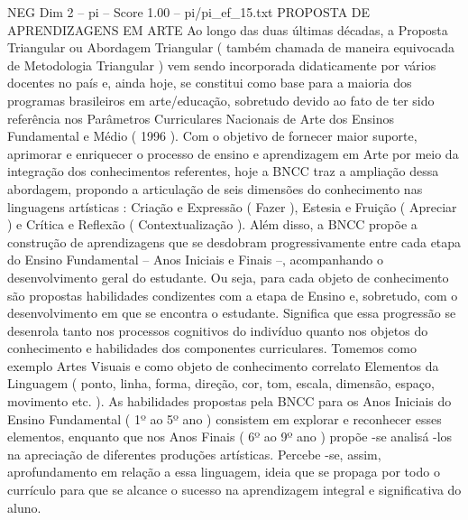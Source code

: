 \begin{textsample}{NEG Dim 2 – pi – Score 1.00 – pi/pi\_ef\_15.txt}  \label{ex:f2_neg_196}
PROPOSTA DE APRENDIZAGENS EM ARTE Ao longo das duas últimas décadas, a Proposta Triangular ou Abordagem Triangular ( também chamada de maneira equivocada de Metodologia Triangular ) vem sendo incorporada didaticamente por vários docentes no país e, ainda hoje, se constitui como base para a maioria dos programas brasileiros em arte/educação, sobretudo devido ao fato de ter sido referência nos Parâmetros Curriculares Nacionais de Arte dos Ensinos Fundamental e Médio ( 1996 ).
Com o objetivo de fornecer maior suporte, aprimorar e enriquecer o processo de ensino e aprendizagem em Arte por meio da integração dos conhecimentos referentes, hoje a BNCC traz a ampliação dessa abordagem, propondo a articulação de seis dimensões do conhecimento nas linguagens artísticas : Criação e Expressão ( Fazer ), Estesia e Fruição ( Apreciar ) e Crítica e Reflexão ( Contextualização ).
Além disso, a BNCC propõe a construção de aprendizagens que se desdobram progressivamente entre cada etapa do Ensino Fundamental – Anos Iniciais e Finais –, acompanhando o desenvolvimento geral do estudante.
Ou seja, para cada objeto de conhecimento são propostas habilidades condizentes com a etapa de Ensino e, sobretudo, com o desenvolvimento em que se encontra o estudante.
Significa que essa progressão se desenrola tanto nos processos cognitivos do indivíduo quanto nos objetos do conhecimento e habilidades dos componentes curriculares.
Tomemos como exemplo Artes Visuais e como objeto de conhecimento correlato Elementos da Linguagem ( ponto, linha, forma, direção, cor, tom, escala, dimensão, espaço, movimento etc. ).
As habilidades propostas pela BNCC para os Anos Iniciais do Ensino Fundamental ( 1º ao 5º ano ) consistem em explorar e reconhecer esses elementos, enquanto que nos Anos Finais ( 6º ao 9º ano ) propõe -se analisá -los na apreciação de diferentes produções artísticas.
Percebe -se, assim, aprofundamento em relação a essa linguagem, ideia que se propaga por todo o currículo para que se alcance o sucesso na aprendizagem integral e significativa do aluno.

\end{textsample}
